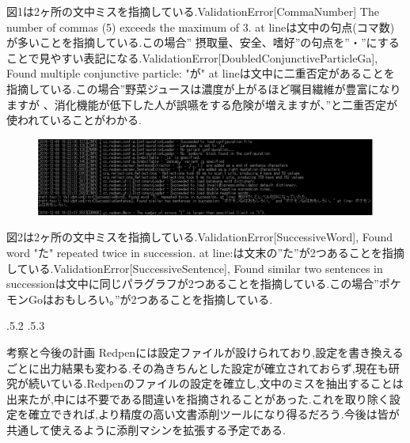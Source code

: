 \documentclass[uplatex]{jsarticle}
\makeatletter
\renewcommand{\section}{%
    \if@slide\clearpage\fi
    \@startsection{section}{1}{\z@}%
    {\Cvs \@plus.5\Cdp \@minus.2\Cdp}%
    {.5\Cvs \@plus.3\Cdp}%
    {\normalfont\raggedright}}
\makeatother
\begin{document}
図1は2ヶ所の文中ミスを指摘している.ValidationError[CommaNumber] The number of commas (5) exceeds the maximum of 3. at lineは文中の句点(コマ数)が多いことを指摘している.この場合” 摂取量、安全、嗜好”の句点を”・”にすることで見やすい表記になる.ValidationError[DoubledConjunctiveParticleGa], Found multiple conjunctive particle: "が" at lineは文中に二重否定があることを指摘している.この場合”野菜ジュースは濃度が上がるほど嘱目繊維が豊富になりますが 、消化機能が低下した人が誤嚥をする危険が増えますが、”と二重否定が使われていることがわかる.

\begin{figure}[htb]
\centering
\includegraphics[width=16cm,clip]{image2.png}
\caption{}\label{サンプル図}
\end{figure}

図2は2ヶ所の文中ミスを指摘している.ValidationError[SuccessiveWord], Found word "た" repeated twice in succession. at line:は文末の”た”が2つあることを指摘している.ValidationError[SuccessiveSentence], Found similar two sentences in successionは文中に同じパラグラフが2つあることを指摘している.この場合”ポケモンGoはおもしろい。”が2つあることを指摘している.

\section{考察と今後の計画}
Redpenには設定ファイルが設けられており,設定を書き換えるごとに出力結果も変わる.その為きちんとした設定が確立されておらず,現在も研究が続いている.Redpenのファイルの設定を確立し,文中のミスを抽出することは出来たが,中には不要である間違いを指摘されることがあった.これを取り除く設定を確立できれば,より精度の高い文書添削ツールになり得るだろう.今後は皆が共通して使えるように添削マシンを拡張する予定である.



\end{document}
